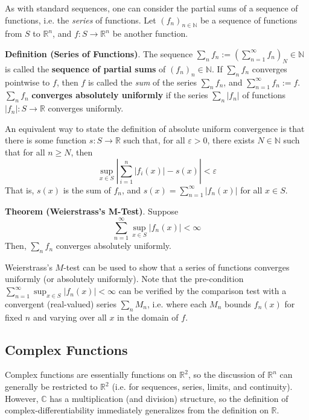 As with standard sequences, one can consider the partial sums of a sequence of functions, i.e. the \textit{series} of functions. Let $(f_n)_{n\in\mathbb{N}}$ be a sequence of functions from $S$ to $\mathbb{R}^n$, and $f:S\to\mathbb{R}^n$ be another function.

\textbf{Definition (Series of Functions)}. The sequence $\sum_n f_n := (\sum_{n=1}^\infty f_n)_N\in\mathbb{N}$ is called the \textbf{sequence of partial sums} of $(f_n)_n\in\mathbb{N}$. If $\sum_n f_n$ converges pointwise to $f$, then $f$ is called the \textit{sum} of the series $\sum_n f_n$, and $\sum_{n=1}^\infty f_n := f$. $\sum_n f_n$ \textbf{converges absolutely uniformly} if the series $\sum_n |f_n|$ of functions $|f_n|:S\to\mathbb{R}$ converges uniformly.

An equivalent way to state the definition of absolute uniform convergence is that there is some function $s:S\to\mathbb{R}$ such that, for all $\varepsilon>0$, there exists $N\in\mathbb{N}$ such that for all $n\geq N$, then \[\sup_{x\in S} \left|\sum_{i=1}^n |f_i(x)| - s(x)\right|<\varepsilon\] That is, $s(x)$ is the sum of $f_n$, and $s(x)=\sum_{n=1}^\infty |f_n(x)|$ for all $x\in S$.

\textbf{Theorem (Weierstrass's M-Test)}. Suppose \[\sum_{n=1}^\infty \sup_{x\in S} |f_n(x)|<\infty\] Then, $\sum_n f_n$ converges absolutely uniformly.

Weierstrass's $M$-test can be used to show that a series of functions converges uniformly (or absolutely uniformly). Note that the pre-condition $\displaystyle\sum_{n=1}^\infty \displaystyle\sup_{x\in S} |f_n(x)|<\infty$ can be verified by the comparison test with a convergent (real-valued) series $\sum_n M_n$, i.e. where each $M_n$ bounds $f_n(x)$ for fixed $n$ and varying over all $x$ in the domain of $f$.

\subsection{Complex Functions}

Complex functions are essentially functions on $\mathbb{R}^2$, so the discussion of $\mathbb{R}^n$ can generally be restricted to $\mathbb{R}^2$ (i.e. for sequences, series, limits, and continuity). However, $\mathbb{C}$ has a multiplication (and division) structure, so the definition of complex-differentiability immediately generalizes from the definition on $\mathbb{R}$.

